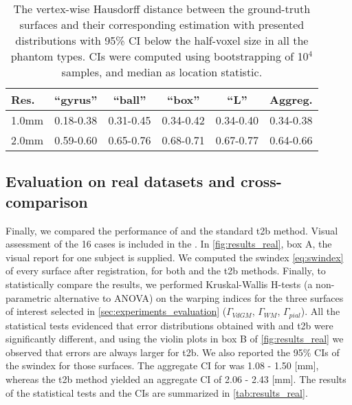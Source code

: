 \begin{table}
		\centering
		\footnotesize
    \tabcolsep=0.1cm
    \begin{tabular}{lccccc}
    Res.   & ``gyrus'' & ``ball''  & ``box''   & ``L''     & Aggreg.    \\\hline
    1.0mm  & 0.18-0.38 & 0.31-0.45 & 0.34-0.42 & 0.34-0.40 & 0.34-0.38  \\
    2.0mm  & 0.59-0.60 & 0.65-0.76 & 0.68-0.71 & 0.67-0.77 & 0.64-0.66  \\
    \hline
    \end{tabular}
    \caption{The vertex-wise Hausdorff distance between the ground-truth surfaces and their
    corresponding estimation with \regseg{} presented distributions with 95\% CI below
    the half-voxel size in all the phantom types.
    CIs were computed using bootstrapping of 10$^4$ samples, and median as location statistic.}\label{tab:ci_phantom}
\end{table}

\subsection{Evaluation on real datasets and cross-comparison}\label{sec:results_hcp}
%
Finally, we compared the performance of \regseg{} and the standard \gls*{t2b}
  method.
Visual assessment of the 16 cases is included in the .
In \autoref{fig:results_real}, box A, the visual report for one subject is supplied.
We computed the \gls*{swindex} \eqref{eq:swindex} of every surface after registration,
  for both \regseg{} and the \gls*{t2b} methods.
Finally, to statistically compare the results, we performed Kruskal-Wallis H-tests
  (a non-parametric alternative to ANOVA) on the warping indices for the three surfaces of 
  interest selected in \autoref{sec:experiments_evaluation}
  ($\Gamma_{VdGM}$, $\Gamma_{WM}$, $\Gamma_{pial}$).
All the statistical tests evidenced that error distributions obtained with \regseg{} and
  \gls*{t2b} were significantly different, and using the violin plots in box B of
  \autoref{fig:results_real} we observed that errors are always larger for \gls*{t2b}.
We also reported the 95\% CIs of the \gls*{swindex} for those surfaces.
The aggregate CI for \regseg{} was 1.08 - 1.50 [mm], whereas the \gls*{t2b} method
  yielded an aggregate CI of 2.06 - 2.43 [mm].
The results of the statistical tests and the CIs are summarized in \autoref{tab:results_real}.



